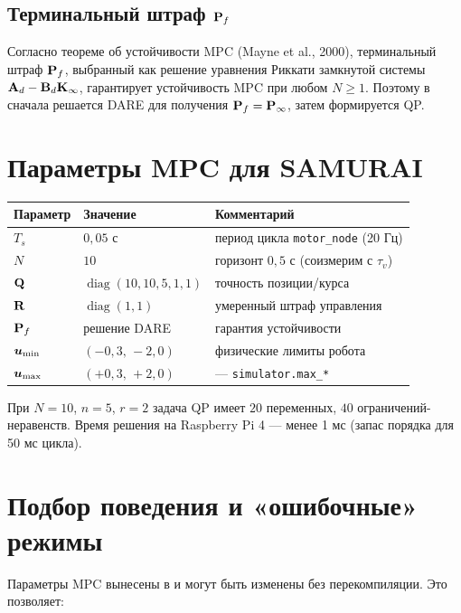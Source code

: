 \subsection{Терминальный штраф $\mathbf{P}_f$}

Согласно теореме об устойчивости MPC (Mayne et al., 2000), терминальный
штраф $\mathbf{P}_f$, выбранный как решение уравнения Риккати замкнутой
системы $\mathbf{A}_d - \mathbf{B}_d\mathbf{K}_\infty$, гарантирует устойчивость
MPC при любом $N \geq 1$. Поэтому в 
сначала решается DARE для получения $\mathbf{P}_f = \mathbf{P}_\infty$,
затем формируется QP.

\section{Параметры MPC для SAMURAI}
\label{sec:mpc_params}

\begin{center}
\begin{tabular}{lll}
\toprule
\textbf{Параметр} & \textbf{Значение} & \textbf{Комментарий}\\
\midrule
$T_s$ & $0{,}05$ с & период цикла \texttt{motor\_node} (20 Гц)\\
$N$ & $10$ & горизонт $0{,}5$ с (соизмерим с $\tau_v$)\\
$\mathbf{Q}$ & $\operatorname{diag}(10,10,5,1,1)$ & точность позиции/курса\\
$\mathbf{R}$ & $\operatorname{diag}(1,1)$ & умеренный штраф управления\\
$\mathbf{P}_f$ & решение DARE & гарантия устойчивости\\
$\bm{u}_{\min}$ & $(-0{,}3,\,-2{,}0)$ & физические лимиты робота\\
$\bm{u}_{\max}$ & $(+0{,}3,\,+2{,}0)$ & --- \texttt{simulator.max\_*}\\
\bottomrule
\end{tabular}
\end{center}

При $N = 10$, $n = 5$, $r = 2$ задача QP имеет $20$ переменных,
$40$ ограничений-неравенств. Время решения на Raspberry Pi 4 ---
менее 1 мс (запас порядка для 50 мс цикла).

\section{Подбор поведения и «ошибочные» режимы}
\label{sec:behavior_tuning}

Параметры MPC вынесены в  и могут быть изменены
без перекомпиляции. Это позволяет:

